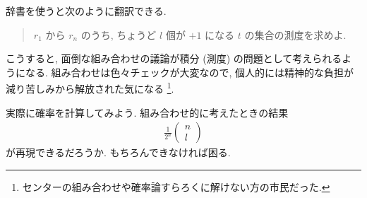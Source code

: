 \documentclass[openany, a4paper, oneside]{book}
\theoremstyle{break}
\theoremstyle{breakdefn}
\begin{document}
辞書を使うと次のように翻訳できる.
\begin{quote}
$r_1$ から $r_n$ のうち, ちょうど $l$ 個が $+1$ になる $t$ の集合の測度を求めよ.
\end{quote}

こうすると, 面倒な組み合わせの議論が積分 (測度) の問題として考えられるようになる.
組み合わせは色々チェックが大変なので, 個人的には精神的な負担が減り苦しみから解放された気になる \footnote{センターの組み合わせや確率論すらろくに解けない方の市民だった.
 }.

実際に確率を計算してみよう.
組み合わせ的に考えたときの結果
\begin{align}
 \frac{1}{2^n}
 \begin{pmatrix}
  n \\
  l
 \end{pmatrix}
\end{align}
が再現できるだろうか.
もちろんできなければ困る.
\end{document}
